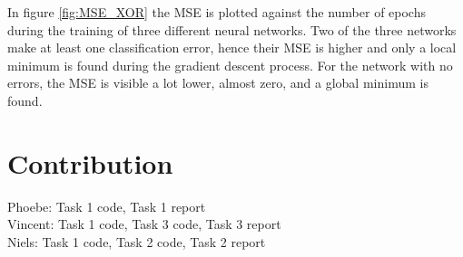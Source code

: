 \documentclass{article} %
\begin{document}
In figure \ref{fig:MSE_XOR} the MSE is plotted against the number of epochs during the training of three different neural networks. Two of the three networks make at least one classification error, hence their MSE is higher and only a local minimum is found during the gradient descent process. For the network with no errors, the MSE is visible a lot lower, almost zero, and a global minimum is found.

\section{Contribution}
Phoebe: Task 1 code, Task 1 report\\
Vincent: Task 1 code, Task 3 code, Task 3 report\\
Niels: Task 1 code, Task 2 code, Task 2 report \\
\end{document}
